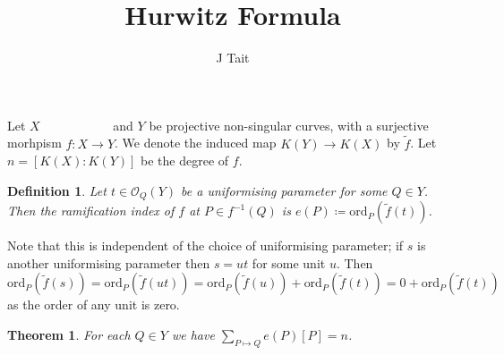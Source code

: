 \documentclass[11pt]{article} %
\title{Hurwitz Formula}
\author{J Tait}
\newtheorem{defn}{Definition}
\newtheorem{thm}{Theorem}
\begin{document}
\maketitle


Let $X$ \ ~\ ~\ ~\ ~\ ~\ and $Y$ be projective non-singular curves, with a surjective morhpism $f:X\rightarrow Y$. We denote the induced map $K(Y)\rightarrow K( X)$ by $\tilde{f}$. Let $n=[K(X):K(Y)]$ be the degree of $f$.


\begin{defn}
	Let $t\in \mathscr{O}_{Q}(Y)$ be a uniformising parameter for some $Q\in Y$. Then the ramification index of $f$ 	at $P\in f^{-1}(Q)$ is $e(P)\coloneq  \textrm{ord}_{P}(\tilde{f} (t))$.
\end{defn}

Note that this is independent of the choice of uniformising parameter; if $s$ is another uniformising parameter then $s=ut$ for some unit $u$. Then 
	\[
		\textrm{ord}_{P}(\tilde{f}(s))=\textrm{ord}_{P}(\tilde{f}(ut))=\textrm{ord}_{P}(\tilde{f}					(u))+\textrm{ord}_{P}(\tilde{f}(t))=0+\textrm{ord}_{P}(\tilde{f}(t))
	\]
as the order of any unit is zero.

\begin{thm}
	For each $Q\in Y$ we have $\sum_{P\mapsto Q}e(P)[P]=n$.
\end{thm}
\end{document}
